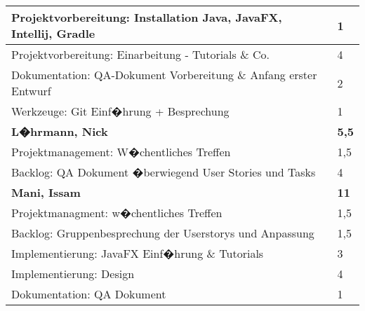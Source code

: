 \documentclass[a4paper,11pt]{scrartcl}
\begin{document}
\begin{longtable}{| p{13.8cm} | C{2.4cm} |}
  Projektvorbereitung: Installation Java, JavaFX, Intellij, Gradle
	&
  1
	\\
	\hline

  Projektvorbereitung: Einarbeitung - Tutorials \& Co.
	&
  4
	\\
	\hline

  Dokumentation: QA-Dokument Vorbereitung \& Anfang erster Entwurf
	&
  2
	\\
	\hline

  Werkzeuge: Git Einf�hrung + Besprechung
	&
  1
	\\
	\hline
	\hline


	\textbf{L�hrmann, Nick} & \textbf{5,5}\\ %
	\hline

	Projektmanagement: W�chentliches Treffen
	&
	1,5
	\\
	\hline

	Backlog: QA Dokument �berwiegend User Stories und Tasks
	&
  4
	\\
	\hline
	\hline


	\textbf{Mani, Issam} & \textbf{11}\\ %
	\hline

  Projektmanagment: w�chentliches Treffen
	&
  1,5
	\\
	\hline

  Backlog: Gruppenbesprechung der Userstorys und Anpassung
	&
  1,5
	\\
	\hline

  Implementierung: JavaFX Einf�hrung \& Tutorials
	&
  3
	\\
	\hline

  Implementierung: Design
	&
  4
	\\
	\hline

  Dokumentation: QA Dokument
	&
  1
	\\
	\hline
	\hline



\end{longtable}
\end{document}
